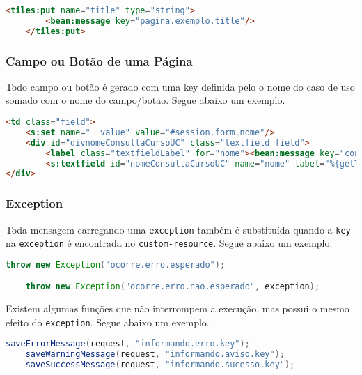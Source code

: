 \begin{lstlisting}[language=html, frame=single, breaklines=true]
	<tiles:put name="title" type="string">
    	<bean:message key="pagina.exemplo.title"/>
	</tiles:put>
\end{lstlisting}

\subsubsection{Campo ou Botão de uma Página}

Todo campo ou botão é gerado com uma key definida pelo o nome do caso de uso
somado com o nome do campo/botão. Segue abaixo um exemplo.

\begin{lstlisting}[language=html, frame=single, breaklines=true]
	<td class="field">
	<s:set name="__value" value="#session.form.nome"/>
	<div id="divnomeConsultaCursoUC" class="textfield field">
    	<label class="textfieldLabel" for="nome"><bean:message key="consulta.curso.uc.preencha.campos.consulta.curso.param.nome"/></label>
    	<s:textfield id="nomeConsultaCursoUC" name="nome" label="%{getText('consulta.curso.uc.preencha.campos.consulta.curso.param.nome')}" value="%{#session.form.nome}" title="" styleId="consultaCursoNome" />
</div>
\end{lstlisting}

\subsubsection{Exception}

Toda mensagem carregando uma \texttt{exception} também é substituída quando a
\texttt{key} na \texttt{exception} é encontrada no \texttt{custom-resource}.
Segue abaixo um exemplo.

\begin{lstlisting}[language=java, frame=single, breaklines=true]
	throw new Exception("ocorre.erro.esperado");

	throw new Exception("ocorre.erro.nao.esperado", exception);
\end{lstlisting}

Existem algumas funções que não interrompem a execução, mas possui o mesmo
efeito do \texttt{exception}. Segue abaixo um exemplo.

\begin{lstlisting}[language=java, frame=single, breaklines=true]
	saveErrorMessage(request, "informando.erro.key");
	saveWarningMessage(request, "informando.aviso.key");
	saveSuccessMessage(request, "informando.sucesso.key");
\end{lstlisting}

